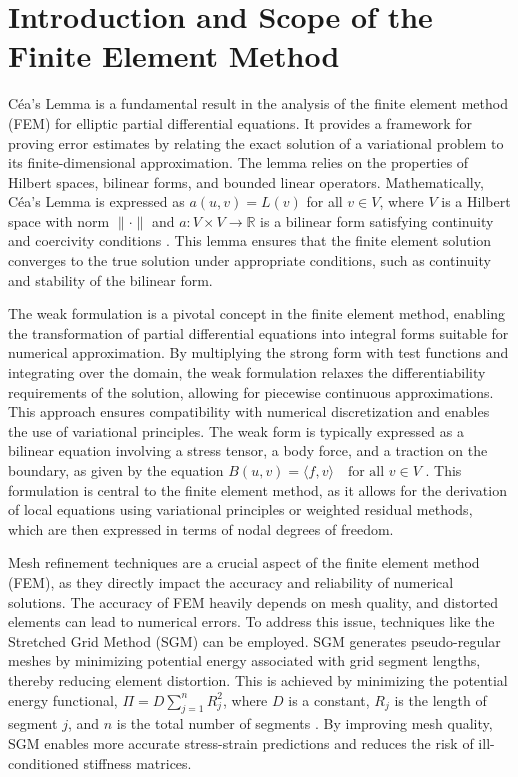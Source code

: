 \documentclass[12pt, a4paper]{article}
\begin{document}
\section{Introduction and Scope of the Finite Element Method}
\label{sec:0557ce05-c337-4bc8-9d53-8f4f1a870fe6}

Céa's Lemma is a fundamental result in the analysis of the finite element method (FEM) for elliptic partial differential equations. It provides a framework for proving error estimates by relating the exact solution of a variational problem to its finite-dimensional approximation. The lemma relies on the properties of Hilbert spaces, bilinear forms, and bounded linear operators. Mathematically, Céa's Lemma is expressed as \(a(u, v) = L(v)\) for all \(v \in V\), where \(V\) is a Hilbert space with norm \(\| \cdot \|\) and \(a: V \times V \rightarrow \mathbb{R}\) is a bilinear form satisfying continuity and coercivity conditions \cite{src:wiki_c_a_s_lemma-c997aed28ad6}. This lemma ensures that the finite element solution converges to the true solution under appropriate conditions, such as continuity and stability of the bilinear form.

The weak formulation is a pivotal concept in the finite element method, enabling the transformation of partial differential equations into integral forms suitable for numerical approximation. By multiplying the strong form with test functions and integrating over the domain, the weak formulation relaxes the differentiability requirements of the solution, allowing for piecewise continuous approximations. This approach ensures compatibility with numerical discretization and enables the use of variational principles. The weak form is typically expressed as a bilinear equation involving a stress tensor, a body force, and a traction on the boundary, as given by the equation \(B(u, v) = \langle f, v \rangle \quad \text{for all } v \in V\) \cite{src:wiki_babu_ka_lax_milgram_theorem-a334b87f26cc}. This formulation is central to the finite element method, as it allows for the derivation of local equations using variational principles or weighted residual methods, which are then expressed in terms of nodal degrees of freedom.

Mesh refinement techniques are a crucial aspect of the finite element method (FEM), as they directly impact the accuracy and reliability of numerical solutions. The accuracy of FEM heavily depends on mesh quality, and distorted elements can lead to numerical errors. To address this issue, techniques like the Stretched Grid Method (SGM) can be employed. SGM generates pseudo-regular meshes by minimizing potential energy associated with grid segment lengths, thereby reducing element distortion. This is achieved by minimizing the potential energy functional, \(\Pi = D \sum_{j=1}^{n} R_j^2\), where \(D\) is a constant, \(R_j\) is the length of segment \(j\), and \(n\) is the total number of segments \cite{src:wiki_stretched_grid_method-c5b6e6e4f51e}. By improving mesh quality, SGM enables more accurate stress-strain predictions and reduces the risk of ill-conditioned stiffness matrices.
\end{document}
